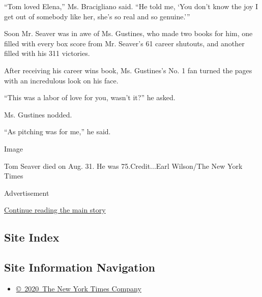 ``Tom loved Elena,'' Ms. Bracigliano said. ``He told me, `You don't know
the joy I get out of somebody like her, she's so real and so genuine.'''

Soon Mr. Seaver was in awe of Ms. Gustines, who made two books for him,
one filled with every box score from Mr. Seaver's 61 career shutouts,
and another filled with his 311 victories.

After receiving his career wins book, Ms. Gustines's No. 1 fan turned
the pages with an incredulous look on his face.

``This was a labor of love for you, wasn't it?'' he asked.

Ms. Gustines nodded.

``As pitching was for me,'' he said.

Image

Tom Seaver died on Aug. 31. He was 75.Credit...Earl Wilson/The New York
Times

Advertisement

\protect\hyperlink{after-bottom}{Continue reading the main story}

\hypertarget{site-index}{%
\subsection{Site Index}\label{site-index}}

\hypertarget{site-information-navigation}{%
\subsection{Site Information
Navigation}\label{site-information-navigation}}

\begin{itemize}
\tightlist
\item
  \href{https://help.nytimes3xbfgragh.onion/hc/en-us/articles/115014792127-Copyright-notice}{©~2020~The
  New York Times Company}
\end{itemize}

